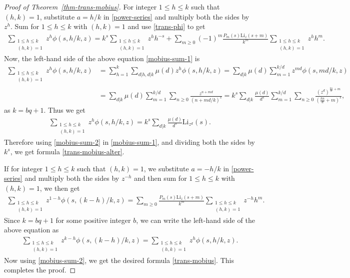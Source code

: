 \documentclass[12pt]{amsart}
\newcommand{\thmref}[1]{Theorem~\ref{#1}}
\begin{document}
\begin{proof}[Proof of \thmref{thm-trans-mobius}]
For integer $1\leq h\leq k$ such that $(h,k)=1$, substitute $a=h/k$ in \eqref{power-series}  and multiply both the sides by $z^h$. 
Sum for $1\leq h\leq k$ with $(h,k)=1$ and use \eqref{trans-phi} to get
\begin{align}\label{mobius-sum-1}
\sum_{ \substack{1\leq h\leq k \\(h,k)=1}}z^h\phi(s,h/k,z)=k^s\sum_{ \substack{1\leq h\leq k \\(h,k)=1}}z^hh^{-s}+
\sum_{m\geq0}(-1)^m\frac{P_m(s)\mathrm{Li}_z(s+m)}{k^m}\sum_{\substack{1\leq h\leq k \\(h,k)=1}}z^hh^m.
\end{align}
Now, the left-hand side of the above equation \eqref{mobius-sum-1} is
\begin{align*}
\sum_{ \substack{1\leq h\leq k \\(h,k)=1}}z^{h}\phi(s,h/k,z)
&=\sum_{h=1}^{k}\sum_{d|h, d|k}\mu(d)z^{h}\phi(s,h/k,z) =\sum_{d|k}\mu(d)\sum_{m=1}^{k/d}z^{md}\phi(s,md/k,z)\\
&=\sum_{d|k}\mu(d)\sum_{m=1}^{k/d}\sum_{n\ge 0}\frac{z^{n+md}}{(n+md/k)^s}
= k^s\sum_{d|k}\frac{\mu(d)}{d^s}\sum_{m=1}^{k/d}\sum_{n\ge 0}\frac{(z^d)^{\frac{kn}{d}+m}}{(\frac{kn}{d}+m)^s},    
\end{align*}
as $k=bq+1$. Thus we get
 \begin{align}\label{mobius-sum-2}
 \sum_{ \substack{1\leq h\leq k\\ (h,k)=1}}z^{h}\phi(s,h/k,z)=  k^s\sum_{d|k}\frac{\mu(d)}{d^s}\mathrm{Li}_{z^d}(s). 
\end{align} 
Therefore using \eqref{mobius-sum-2} in \eqref{mobius-sum-1}, and dividing both the sides by $k^s$, we get formula \eqref{trans-mobius-alter}.

If for integer $1\leq h\leq k$ such that $(h,k)=1$, we substitute $a=-h/k$ in \eqref{power-series} and multiply both the sides by $z^{-h}$ and then sum for
$1\leq h\leq k$ with $(h,k)=1$, we then get
\begin{align*}
\sum_{ \substack{1\leq h\leq k \\(h,k)=1}}z^{1-h}\phi(s,(k-h)/k,z)=\sum_{m\geq0}\frac{P_m(s)\mathrm{Li}_z(s+m)}{k^m}\sum_{\substack{1\leq h\leq k \\(h,k)=1}}z^{-h}h^m.
\end{align*}
Since $k=bq+1$ for some positive integer $b$, we can write the left-hand side of the above equation as
\begin{align*}
\sum_{ \substack{1\leq h\leq k \\(h,k)=1}}z^{k-h}\phi(s,(k-h)/k,z)=\sum_{ \substack{1\leq h\leq k \\(h,k)=1}}z^{h}\phi(s,h/k,z).
\end{align*}
Now using \eqref{mobius-sum-2}, we get the desired formula \eqref{trans-mobius}. This completes the proof.
\end{proof}
\end{document}
